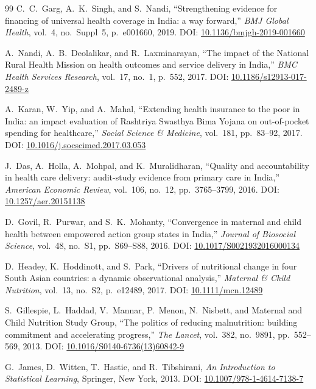 \documentclass[conference]{IEEEtran}
\begin{document}
\begin{thebibliography}{99}
C.~C.\ Garg, A.~K.\ Singh, and S.\ Nandi,
``Strengthening evidence for financing of universal health coverage in India: a way forward,''
\textit{BMJ Global Health}, vol.~4, no.~Suppl~5, p.\ e001660, 2019.
DOI: \href{https://doi.org/10.1136/bmjgh-2019-001660}{10.1136/bmjgh-2019-001660}

A.\ Nandi, A.~B.\ Deolalikar, and R.\ Laxminarayan,
``The impact of the National Rural Health Mission on health outcomes and service delivery in India,''
\textit{BMC Health Services Research}, vol.~17, no.~1, p.\ 552, 2017.
DOI: \href{https://doi.org/10.1186/s12913-017-2489-z}{10.1186/s12913-017-2489-z}

A.\ Karan, W.\ Yip, and A.\ Mahal,
``Extending health insurance to the poor in India: an impact evaluation of Rashtriya Swasthya Bima Yojana on out-of-pocket spending for healthcare,''
\textit{Social Science \& Medicine}, vol.~181, pp.~83--92, 2017.
DOI: \href{https://doi.org/10.1016/j.socscimed.2017.03.053}{10.1016/j.socscimed.2017.03.053}

J.\ Das, A.\ Holla, A.\ Mohpal, and K.\ Muralidharan,
``Quality and accountability in health care delivery: audit-study evidence from primary care in India,''
\textit{American Economic Review}, vol.~106, no.~12, pp.~3765--3799, 2016.
DOI: \href{https://doi.org/10.1257/aer.20151138}{10.1257/aer.20151138}

D.\ Govil, R.\ Purwar, and S.~K.\ Mohanty,
``Convergence in maternal and child health between empowered action group states in India,''
\textit{Journal of Biosocial Science}, vol.~48, no.~S1, pp.~S69--S88, 2016.
DOI: \href{https://doi.org/10.1017/S0021932016000134}{10.1017/S0021932016000134}

D.\ Headey, K.\ Hoddinott, and S.\ Park,
``Drivers of nutritional change in four South Asian countries: a dynamic observational analysis,''
\textit{Maternal \& Child Nutrition}, vol.~13, no.~S2, p.\ e12489, 2017.
DOI: \href{https://doi.org/10.1111/mcn.12489}{10.1111/mcn.12489}

S.\ Gillespie, L.\ Haddad, V.\ Mannar, P.\ Menon, N.\ Nisbett,
and Maternal and Child Nutrition Study Group,
``The politics of reducing malnutrition: building commitment and accelerating progress,''
\textit{The Lancet}, vol.~382, no.~9891, pp.~552--569, 2013.
DOI: \href{https://doi.org/10.1016/S0140-6736(13)60842-9}{10.1016/S0140-6736(13)60842-9}

G.\ James, D.\ Witten, T.\ Hastie, and R.\ Tibshirani,
\textit{An Introduction to Statistical Learning},
Springer, New York, 2013.
DOI: \href{https://doi.org/10.1007/978-1-4614-7138-7}{10.1007/978-1-4614-7138-7}

\end{thebibliography}
\end{document}
